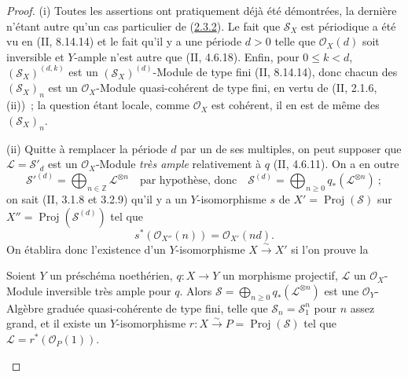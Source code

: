 \begin{proof}
(i) Toutes les assertions ont pratiquement déjà été démontrées, la
dernière n'étant autre qu'un cas particulier de
(\hyperref[III.2.3.2-fr]{2.3.2}). Le fait que $\mathcal S_X$ est
périodique a été vu en (II, 8.14.14) et le fait qu'il y a une période
$d>0$ telle que $\mathcal O_X(d)$ soit inversible et $Y$-ample n'est
autre que (II, 4.6.18). Enfin, pour $0\leq k<d$,
$(\mathcal S_X)^{(d,k)}$ est un $(\mathcal S_X)^{(d)}$-Module de type fini
(II, 8.14.14), donc chacun des $(\mathcal S_X)_n$ est un
$\mathcal O_X$-Module quasi-cohérent de type fini, en vertu de
(II, 2.1.6, (ii))~; la question étant locale, comme $\mathcal O_X$ est
cohérent, il en est de même des $(\mathcal S_X)_n$.

(ii) Quitte à remplacer la période $d$ par un de ses multiples, on peut
supposer que $\mathcal L=\mathcal S'_d$ est un $\mathcal O_X$-Module
\emph{très ample} relativement à $q$ (II, 4.6.11). On a en outre
\[
\mathcal S'^{(d)}=\bigoplus_{n\in\mathbb Z}\mathcal L^{\otimes n}
\quad\text{par hypothèse, donc}\quad
\mathcal S^{(d)}=\bigoplus_{n\geq0}q_*(\mathcal L^{\otimes n})~;
\]
on sait (II, 3.1.8 et 3.2.9) qu'il y a un $Y$-isomorphisme $s$ de
$X'=\operatorname{Proj}(\mathcal S)$ sur
$X''=\operatorname{Proj}(\mathcal S^{(d)})$ tel que
\[
s^*(\mathcal O_{X''}(n))=\mathcal O_{X'}(nd).
\]
On établira donc l'existence d'un $Y$-isomorphisme $X\xrightarrow{\sim}X'$
si l'on prouve la

\begin{env}[2.3.4.1]
\label{III.2.3.4.1-fr}
Soient $Y$ un préschéma noethérien, $q:X\to Y$ un morphisme projectif,
$\mathcal L$ un $\mathcal O_X$-Module inversible très ample pour $q$.
Alors $\mathcal S=\bigoplus_{n\geq0}q_*(\mathcal L^{\otimes n})$ est une
$\mathcal O_Y$-Algèbre graduée quasi-cohérente de type fini, telle que
$\mathcal S_n=\mathcal S_1^n$ pour $n$ assez grand, et il existe un
$Y$-isomorphisme $r:X\xrightarrow{\sim}P=\operatorname{Proj}(\mathcal S)$
tel que $\mathcal L=r^*(\mathcal O_P(1))$.
\end{env}


\end{proof}

